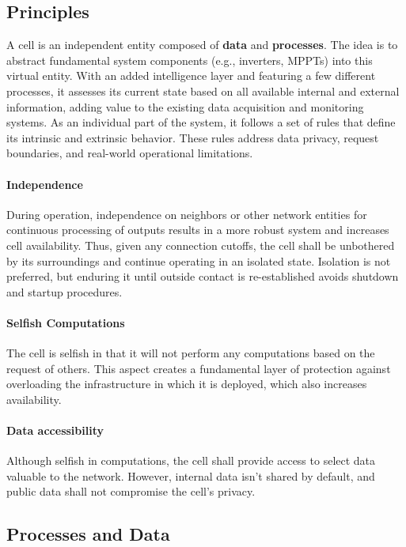 \subsection{Principles}

A cell is an independent entity composed of \textbf{data} and \textbf{processes}. The idea is to abstract fundamental system components (e.g., inverters, MPPTs) into this virtual entity. With an added intelligence layer and featuring a few different processes, it assesses its current state based on all available internal and external information, adding value to the existing data acquisition and monitoring systems. As an individual part of the system, it follows a set of rules that define its intrinsic and extrinsic behavior. These rules address data privacy, request boundaries, and real-world operational limitations.

\paragraph*{Independence} During operation, independence on neighbors or other network entities for continuous processing of outputs results in a more robust system and increases cell availability. Thus, given any connection cutoffs, the cell shall be unbothered by its surroundings and continue operating in an isolated state. Isolation is not preferred, but enduring it until outside contact is re-established avoids shutdown and startup procedures.

\paragraph*{Selfish Computations} The cell is selfish in that it will not perform any computations based on the request of others. This aspect creates a fundamental layer of protection against overloading the infrastructure in which it is deployed, which also increases availability.

\paragraph*{Data accessibility} Although selfish in computations, the cell shall provide access to select data valuable to the network. However, internal data isn't shared by default, and public data shall not compromise the cell's privacy.

\subsection{Processes and Data}


